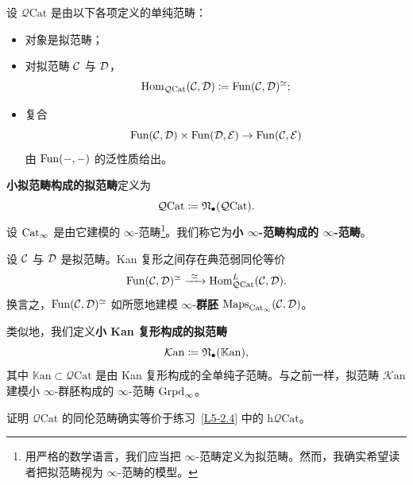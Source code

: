 \begin{definition}\label{L5-7.2}
设 $\mathcal{Q}\mathrm{Cat}$ 是由以下各项定义的单纯范畴：
\begin{itemize}[leftmargin=2.2em,itemsep=0.1em]
\item 对象是拟范畴；
\item 对拟范畴 $\mathcal{C}$ 与 $\mathcal{D}$，
\[
\operatorname{Hom}_{\mathcal{Q}\mathrm{Cat}}(\mathcal{C},\mathcal{D})\coloneqq\operatorname{Fun}(\mathcal{C},\mathcal{D})^{\simeq};
\]
\item 复合
\[
\operatorname{Fun}(\mathcal{C},\mathcal{D})\times\operatorname{Fun}(\mathcal{D},\mathcal{E})\to\operatorname{Fun}(\mathcal{C},\mathcal{E})
\]
由 $\operatorname{Fun}(-,-)$ 的泛性质给出。
\end{itemize}
\end{definition}

\begin{definition}\label{L5-7.3}
\textbf{小拟范畴构成的拟范畴}定义为
\[
\mathcal{Q}\mathrm{Cat}\coloneqq\mathfrak{N}_{\bullet}(\mathcal{Q}\mathrm{Cat}).
\]
设 $\operatorname{Cat}_\infty$ 是由它建模的 $\infty$-范畴\footnote{用严格的数学语言，我们应当把 $\infty$-范畴定义为拟范畴。然而，我确实希望读者把拟范畴视为 $\infty$-范畴的模型。}。我们称它为\textbf{小 $\infty$-范畴构成的 $\infty$-范畴}。
\end{definition}


\begin{exercise}\label{L5-7.4}
设 $\mathcal{C}$ 与 $\mathcal{D}$ 是拟范畴。Kan 复形之间存在典范弱同伦等价
\[
\Fun(\cC,\cD)^{\simeq}\xrightarrow{\ \simeq\ }\Hom^{L}_{\mathcal{Q}\mathrm{Cat}}(\cC,\cD).
\]
换言之，$\operatorname{Fun}(\mathcal{C},\mathcal{D})^{\simeq}$ 如所愿地建模 $\infty$-\textbf{群胚} $\mathrm{Maps}_{\operatorname{Cat}_\infty}(\mathcal{C},\mathcal{D})$。
\end{exercise}

\begin{variant}\label{L5-7.5}
类似地，我们定义\textbf{小 Kan 复形构成的拟范畴}
\[
\mathcal{K}\mathrm{an}\coloneqq\mathfrak{N}_{\bullet}(\mathbb{K}\mathrm{an}),
\]
其中 $\mathbb{K}\mathrm{an}\subset\mathcal{Q}\mathrm{Cat}$ 是由 Kan 复形构成的全单纯子范畴。与之前一样，拟范畴 $\mathcal{K}\mathrm{an}$ 建模小 $\infty$-群胚构成的 $\infty$-范畴 $\operatorname{Grpd}_\infty$。
\end{variant}

\begin{exercise}\label{L5-7.6}
证明 $\mathcal{Q}\mathrm{Cat}$ 的同伦范畴确实等价于练习~\ref{L5-2.4} 中的 $\mathrm{h}\mathcal{Q}\mathrm{Cat}$。
\end{exercise}

